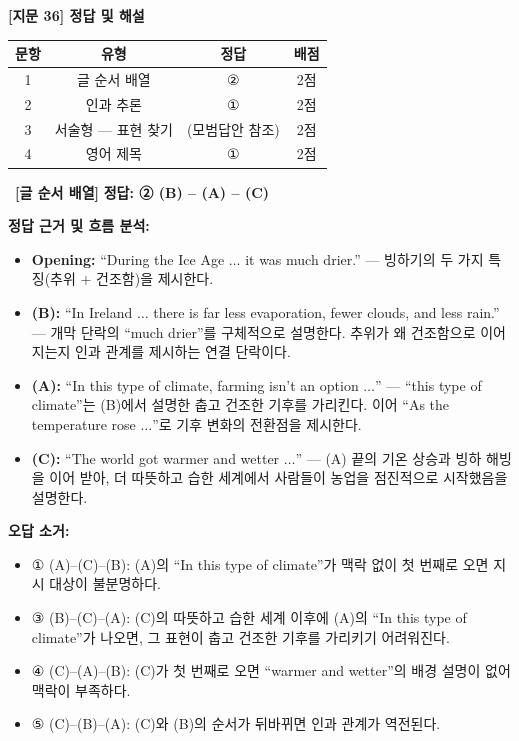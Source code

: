 \documentclass[11pt,a4paper]{article}
\newcommand{\qno}[1]{\par\vspace{10pt}\noindent{\sffamily\bfseries #1.}\ }
\begin{document}
\begin{center}
{\fontsize{15}{17}\selectfont\sffamily\bfseries [지문 36] 정답 및 해설}
\end{center}
\vspace{8pt}

\begin{center}
\renewcommand{\arraystretch}{1.4}
\begin{tabular}{cccc}
\toprule
\textbf{문항} & \textbf{유형} & \textbf{정답} & \textbf{배점} \\
\midrule
1 & 글 순서 배열 & ② & 2점 \\
2 & 인과 추론 & ① & 2점 \\
3 & 서술형 --- 표현 찾기 & (모범답안 참조) & 2점 \\
4 & 영어 제목 & ① & 2점 \\
\bottomrule
\end{tabular}
\end{center}

\vspace{10pt}

\qno{1}\textbf{[글 순서 배열]} \textbf{정답: ② (B) -- (A) -- (C)}

\vspace{4pt}
\noindent\textbf{정답 근거 및 흐름 분석:}

\begin{itemize}[leftmargin=2em,itemsep=3pt,topsep=3pt]
  \item \textbf{Opening:} ``During the Ice Age $\ldots$ it was much drier.'' --- 빙하기의 두 가지 특징(추위 + 건조함)을 제시한다.
  \item \textbf{(B):} ``In Ireland $\ldots$ there is far less evaporation, fewer clouds, and less rain.'' --- 개막 단락의 ``much drier''를 구체적으로 설명한다. 추위가 왜 건조함으로 이어지는지 인과 관계를 제시하는 연결 단락이다.
  \item \textbf{(A):} ``In this type of climate, farming isn't an option $\ldots$'' --- ``this type of climate''는 (B)에서 설명한 춥고 건조한 기후를 가리킨다. 이어 ``As the temperature rose $\ldots$''로 기후 변화의 전환점을 제시한다.
  \item \textbf{(C):} ``The world got warmer and wetter $\ldots$'' --- (A) 끝의 기온 상승과 빙하 해빙을 이어 받아, 더 따뜻하고 습한 세계에서 사람들이 농업을 점진적으로 시작했음을 설명한다.
\end{itemize}

\vspace{4pt}
\noindent\textbf{오답 소거:}
\begin{itemize}[leftmargin=2em,itemsep=2pt]
  \item ① (A)--(C)--(B): (A)의 ``In this type of climate''가 맥락 없이 첫 번째로 오면 지시 대상이 불분명하다.
  \item ③ (B)--(C)--(A): (C)의 따뜻하고 습한 세계 이후에 (A)의 ``In this type of climate''가 나오면, 그 표현이 춥고 건조한 기후를 가리키기 어려워진다.
  \item ④ (C)--(A)--(B): (C)가 첫 번째로 오면 ``warmer and wetter''의 배경 설명이 없어 맥락이 부족하다.
  \item ⑤ (C)--(B)--(A): (C)와 (B)의 순서가 뒤바뀌면 인과 관계가 역전된다.
\end{itemize}
\end{document}
